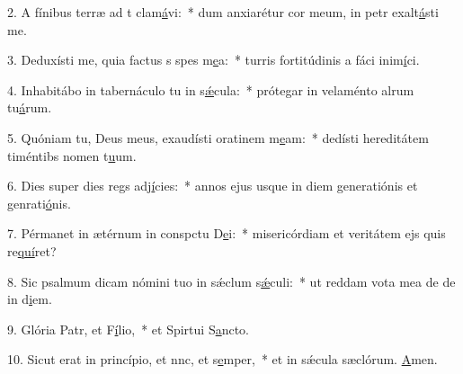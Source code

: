 2. A fínibus terræ ad t clam\uline{á}vi:~* dum anxiarétur cor meum, in petr exalt\uline{á}sti me.\par 
3. Deduxísti me, quia factus s spes m\uline{e}a:~* turris fortitúdinis a fáci inim\uline{í}ci.\par 
4. Inhabitábo in tabernáculo tu in s\uline{ǽ}cula:~* prótegar in velaménto alrum tu\uline{á}rum.\par 
5. Quóniam tu, Deus meus, exaudísti oratinem m\uline{e}am:~* dedísti hereditátem timéntibs nomen t\uline{u}um.\par 
6. Dies super dies regs adj\uline{í}cies:~* annos ejus usque in diem generatiónis et genrati\uline{ó}nis.\par 
7. Pérmanet in ætérnum in conspctu D\uline{e}i:~* misericórdiam et veritátem ejs quis re\uline{quí}ret?\par 
8. Sic psalmum dicam nómini tuo in sǽclum s\uline{ǽ}culi:~* ut reddam vota mea de de in d\uline{i}em.\par 
9. Glória Patr, et F\uline{í}lio,~* et Spirtui S\uline{a}ncto.\par 
10. Sicut erat in princípio, et nnc, et s\uline{e}mper,~* et in sǽcula sæclórum. \uline{A}men.\par 
